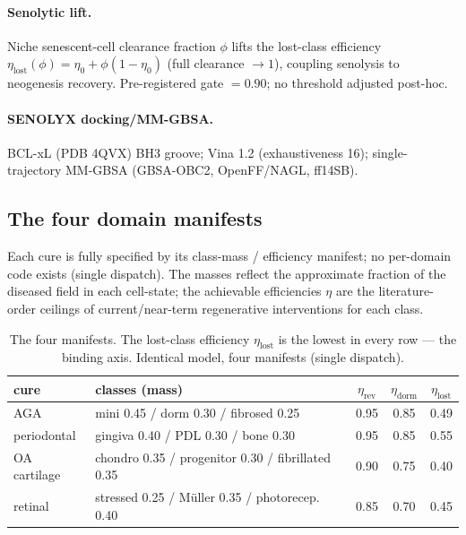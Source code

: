 \documentclass[11pt,a4paper]{article}
\begin{document}
\paragraph{Senolytic lift.} Niche senescent-cell clearance fraction $\phi$ lifts the
lost-class efficiency $\eta_{\text{lost}}(\phi)=\eta_0+\phi(1-\eta_0)$ (full clearance
$\to 1$), coupling senolysis to neogenesis recovery. Pre-registered gate $=0.90$; no
threshold adjusted post-hoc.
\paragraph{SENOLYX docking/MM-GBSA.} BCL-xL (PDB 4QVX) BH3 groove; Vina 1.2 (exhaustiveness
16); single-trajectory MM-GBSA (GBSA-OBC2, OpenFF/NAGL, ff14SB).

\subsection{The four domain manifests}
\label{sec:manifests}
Each cure is fully specified by its class-mass / efficiency manifest; no per-domain code
exists (single dispatch). The masses reflect the approximate fraction of the diseased field
in each cell-state; the achievable efficiencies $\eta$ are the literature-order ceilings of
current/near-term regenerative interventions for each class.

\begin{table}[h]\centering\small
\begin{tabular}{llccc}
\toprule
\textbf{cure} & \textbf{classes (mass)} & $\eta_{\text{rev}}$ & $\eta_{\text{dorm}}$ & $\eta_{\text{lost}}$ \\
\midrule
AGA & mini 0.45 / dorm 0.30 / fibrosed 0.25 & 0.95 & 0.85 & 0.49 \\
periodontal & gingiva 0.40 / PDL 0.30 / bone 0.30 & 0.95 & 0.85 & 0.55 \\
OA cartilage & chondro 0.35 / progenitor 0.30 / fibrillated 0.35 & 0.90 & 0.75 & 0.40 \\
retinal & stressed 0.25 / M\"uller 0.35 / photorecep. 0.40 & 0.85 & 0.70 & 0.45 \\
\bottomrule
\end{tabular}
\caption{The four manifests. The lost-class efficiency $\eta_{\text{lost}}$ is the lowest
in every row --- the binding axis. Identical model, four manifests (single dispatch).}
\label{tab:manifests}
\end{table}
\end{document}
